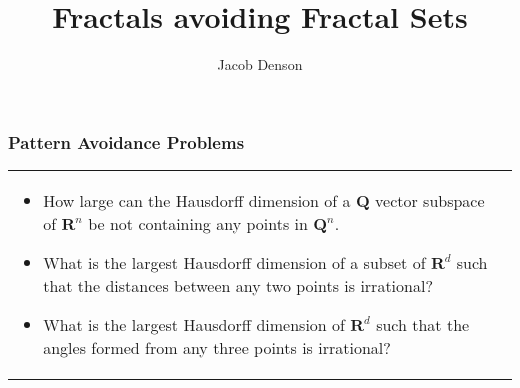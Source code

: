 \documentclass[usenames,dvipsnames]{beamer}
\title{Fractals avoiding Fractal Sets}
\author{Jacob Denson}
\institute{University of British Columbia}
\begin{document}
\maketitle

\begin{frame}
  \frametitle{Pattern Avoidance Problems}

\begin{tabular}{p{}p{}}

\begin{itemize}
    \item How large can the Hausdorff dimension of a $\mathbf{Q}$ vector subspace of $\mathbf{R}^n$ be not containing any points in $\mathbf{Q}^n$.

     \pause
     \item What is the largest Hausdorff dimension of a subset of $\mathbf{R}^d$ such that the distances between any two points is irrational?

     \pause
     \item What is the largest Hausdorff dimension of $\mathbf{R}^d$ such that the angles formed from any three points is irrational?
\end{itemize}

\end{tabular}

\end{frame}
\end{document}
